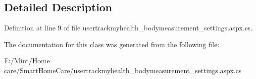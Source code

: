 \subsection{Detailed Description}


Definition at line 9 of file usertrackmyhealth\-\_\-bodymeasurement\-\_\-settings.\-aspx.\-cs.



The documentation for this class was generated from the following file\-:\begin{DoxyCompactItemize}
\item 
E\-:/\-Mint/\-Home care/\-Smart\-Home\-Care/usertrackmyhealth\-\_\-bodymeasurement\-\_\-settings.\-aspx.\-cs\end{DoxyCompactItemize}
